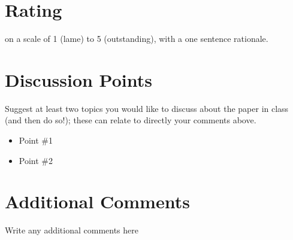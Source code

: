 \documentclass[sigconf, 10pt]{acmart}
\begin{document}
\section{Rating}
on a scale of 1 (lame) to 5 (outstanding), with a one sentence rationale.

\section{Discussion Points}
Suggest at least two topics you would like to discuss about the paper in class (and then do so!); these can relate to directly your comments above. 
\begin{itemize}
    \item Point \#1
    \item Point \#2
\end{itemize}

\section{Additional Comments}
Write any additional comments here
\end{document}
